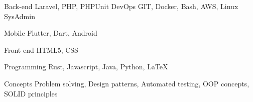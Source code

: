 

\begin{cvskills}

  \cvskill
    {Back-end} %
    {
      Laravel, PHP, PHPUnit
    } %
  \cvskill
    {DevOps} %
    {GIT, Docker, Bash, AWS, Linux SysAdmin} %

  \cvskill
    {Mobile} %
    {Flutter, Dart, Android} %

  \cvskill
    {Front-end} %
    {HTML5, CSS} %

  \cvskill
    {Programming} %
    {Rust, Javascript, Java, Python, LaTeX} %

  \cvskill
    {Concepts} %
    {Problem solving, Design patterns, Automated testing, OOP concepts, SOLID principles} %

\end{cvskills}
